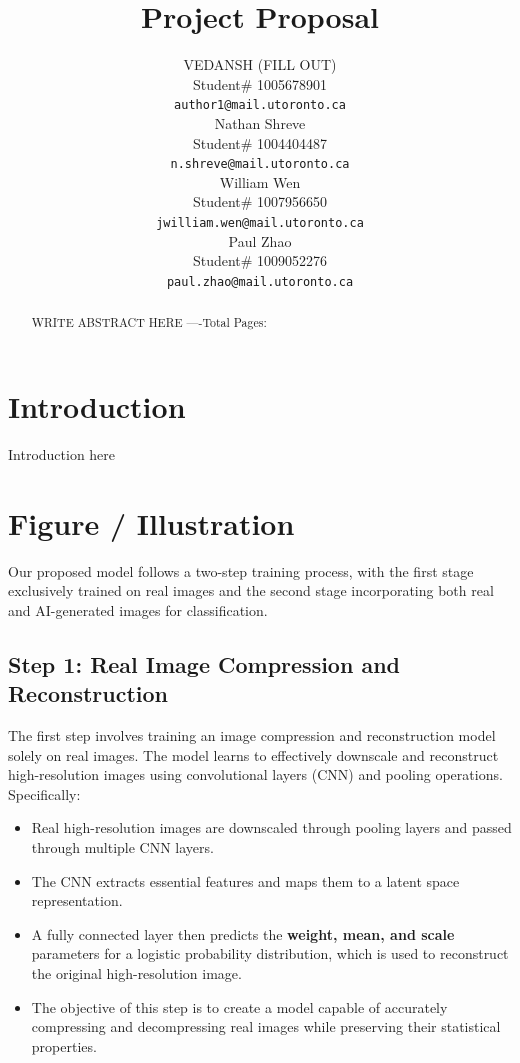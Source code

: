 \documentclass{article} %
\title{Project Proposal}
\author{VEDANSH (FILL OUT)  \\
Student\# 1005678901 \\
\texttt{author1@mail.utoronto.ca} \\
\And
Nathan Shreve  \\
Student\# 1004404487 \\
\texttt{n.shreve@mail.utoronto.ca} \\
\AND
William Wen  \\
Student\# 1007956650 \\
\texttt{jwilliam.wen@mail.utoronto.ca} \\
\And
Paul Zhao \\
Student\# 1009052276 \\
\texttt{paul.zhao@mail.utoronto.ca} \\
\AND
}
\begin{document}
\maketitle

\begin{abstract}
WRITE ABSTRACT HERE
----Total Pages: \pageref{last_page}
\end{abstract}



\section{Introduction}
\label{intro}

Introduction here

\section{Figure / Illustration}
\label{illustration}

Our proposed model follows a two-step training process, with the first stage exclusively trained on real images and the second stage incorporating both real and AI-generated images for classification.

\subsection{Step 1: Real Image Compression and Reconstruction}
The first step involves training an image compression and reconstruction model solely on real images. The model learns to effectively downscale and reconstruct high-resolution images using convolutional layers (CNN) and pooling operations. Specifically:
\begin{itemize}
    \item Real high-resolution images are downscaled through pooling layers and passed through multiple CNN layers.
    \item The CNN extracts essential features and maps them to a latent space representation.
    \item A fully connected layer then predicts the \textbf{weight, mean, and scale} parameters for a logistic probability distribution, which is used to reconstruct the original high-resolution image.
    \item The objective of this step is to create a model capable of accurately compressing and decompressing real images while preserving their statistical properties.
\end{itemize}
\end{document}
